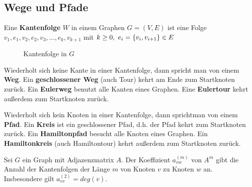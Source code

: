 	\subsection{Wege und Pfade}
	\begin{definition}[Kantenfolge]
		Eine \textbf{Kantenfolge} $W$ in einem Graphen $G = (V, E)$ ist eine Folge $v_1, e_1, v_2, e_2, v_3, ..., e_k, v_{k+1}$ mit $k \ge 0,~e_i = \{v_i, v_{i+1}\} \in E$
	\end{definition}
	\begin{figure}[ht]
		\begin{center}
		\end{center}
		\caption{Kantenfolge in $G$}
	\end{figure}
	\begin{definition}[Weg]
		Wiederholt sich keine Kante in einer Kantenfolge, dann spricht man von einem \textbf{Weg}. Ein \textbf{geschlossener Weg} (auch Tour) kehrt am Ende zum Startknoten zurück. Ein \textbf{Eulerweg} benutzt alle Kanten eines Graphen. Eine \textbf{Eulertour} kehrt außerdem zum Startknoten zurück.
	\end{definition}
	\begin{definition}[Pfad]
		Wiederholt sich kein Knoten in einer Kantenfolge, dann sprichtman von einem \textbf{Pfad}. Ein \textbf{Kreis} ist ein geschlossener Pfad, d.h. der Pfad kehrt zum Startknoten zurück. Ein \textbf{Hamiltonpfad} besucht alle Knoten eines Graphen. Ein \textbf{Hamiltonkreis} (auch Hamiltontour) kehrt außerdem zum Startknoten zurück.
	\end{definition}
	\begin{satz}
		Sei $G$ ein Graph mit Adjazenzmatrix $A$. Der Koeffizient $a_{vw}^{(m)}$ von $A^m$ gibt die Anzahl der Kantenfolgen der Länge $m$ von Knoten $v$ zu Knoten $w$ an. Insbesondere gilt $a_{vv}^{(2)} = deg(v)$.
	\end{satz}
